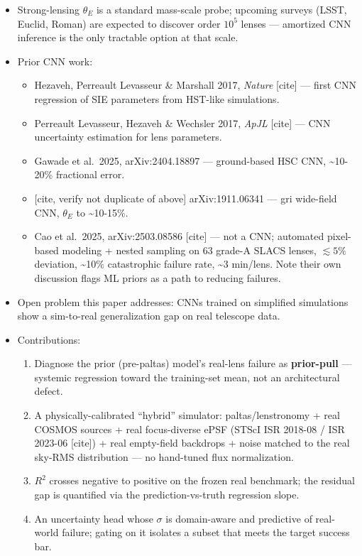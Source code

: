 \documentclass[
  11pt,
]{article}
\providecommand{\tightlist}{%
  \setlength{\itemsep}{0pt}\setlength{\parskip}{0pt}}
\begin{document}
\begin{itemize}
\tightlist
\item
  Strong-lensing \(\theta_E\) is a standard mass-scale probe; upcoming
  surveys (LSST, Euclid, Roman) are expected to discover order \(10^5\)
  lenses --- amortized CNN inference is the only tractable option at
  that scale.
\item
  Prior CNN work:

  \begin{itemize}
  \tightlist
  \item
    Hezaveh, Perreault Levasseur \& Marshall 2017, \emph{Nature}
    {[}cite{]} --- first CNN regression of SIE parameters from HST-like
    simulations.
  \item
    Perreault Levasseur, Hezaveh \& Wechsler 2017, \emph{ApJL}
    {[}cite{]} --- CNN uncertainty estimation for lens parameters.
  \item
    Gawade et al.~2025, arXiv:2404.18897 --- ground-based HSC CNN,
    \textasciitilde10-20\% fractional error.
  \item
    {[}cite, verify not duplicate of above{]} arXiv:1911.06341 --- gri
    wide-field CNN, \(\theta_E\) to \textasciitilde10-15\%.
  \item
    Cao et al.~2025, arXiv:2503.08586 {[}cite{]} --- not a CNN;
    automated pixel-based modeling + nested sampling on 63 grade-A SLACS
    lenses, \(\lesssim 5\%\) deviation, \textasciitilde10\% catastrophic
    failure rate, \textasciitilde3 min/lens. Note their own discussion
    flags ML priors as a path to reducing failures.
  \end{itemize}
\item
  Open problem this paper addresses: CNNs trained on simplified
  simulations show a sim-to-real generalization gap on real telescope
  data.
\item
  Contributions:

  \begin{enumerate}
  \def\labelenumi{\arabic{enumi}.}
  \tightlist
  \item
    Diagnose the prior (pre-paltas) model's real-lens failure as
    \textbf{prior-pull} --- systemic regression toward the training-set
    mean, not an architectural defect.
  \item
    A physically-calibrated ``hybrid'' simulator: paltas/lenstronomy +
    real COSMOS sources + real focus-diverse ePSF (STScI ISR 2018-08 /
    ISR 2023-06 {[}cite{]}) + real empty-field backdrops + noise matched
    to the real sky-RMS distribution --- no hand-tuned flux
    normalization.
  \item
    \(R^2\) crosses negative to positive on the frozen real benchmark;
    the residual gap is quantified via the prediction-vs-truth
    regression slope.
  \item
    An uncertainty head whose \(\sigma\) is domain-aware and predictive
    of real-world failure; gating on it isolates a subset that meets the
    target success bar.
  \end{enumerate}
\end{itemize}
\end{document}
